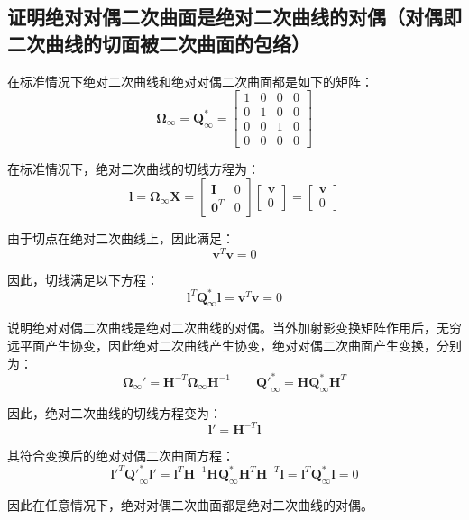\documentclass[11pt]{article}
\begin{document}
\subsection{证明绝对对偶二次曲面是绝对二次曲线的对偶（对偶即二次曲线的切面被二次曲面的包络）}
在标准情况下绝对二次曲线和绝对对偶二次曲面都是如下的矩阵：
\begin{equation*}
  \mathbold{\Omega}_\infty=\mathbold{Q}^*_\infty=\begin{bmatrix}
    1 & 0 & 0 & 0 \\
    0 & 1 & 0 & 0 \\
    0 & 0 & 1 & 0 \\
    0 & 0 & 0 & 0
  \end{bmatrix}
\end{equation*}\par
在标准情况下，绝对二次曲线的切线方程为：
\begin{equation*}
  \mathbold{l}=\mathbold{\Omega}_\infty\mathbold{X}=\begin{bmatrix}
    \mathbf{I}   & 0 \\
    \mathbf{0}^T & 0
  \end{bmatrix}\begin{bmatrix}
    \mathbf{v} \\ 0
  \end{bmatrix}=\begin{bmatrix}
    \mathbf{v} \\ 0
  \end{bmatrix}
\end{equation*}\par
由于切点在绝对二次曲线上，因此满足：
\begin{equation*}
  \mathbold{v}^T\mathbold{v}=0
\end{equation*}\par
因此，切线满足以下方程：
\begin{equation*}
  \mathbf{l}^T\mathbf{Q}_\infty^*\mathbf{l}=\mathbf{v}^T\mathbf{v}=0
\end{equation*}\par
说明绝对对偶二次曲线是绝对二次曲线的对偶。当外加射影变换矩阵作用后，无穷远平面产生协变，因此绝对二次曲线产生协变，绝对对偶二次曲面产生变换，分别为：
\begin{equation*}
  \mathbold{\Omega}_\infty'=\mathbold{H}^{-T}\mathbold{\Omega}_\infty\mathbold{H}^{-1}\qquad\mathbf{Q'}_\infty^{*}=\mathbold{H}\mathbold{Q}_\infty^*\mathbold{H}^T
\end{equation*}\par
因此，绝对二次曲线的切线方程变为：
\begin{equation*}
  \mathbold{l}'=\mathbf{H}^{-T}\mathbf{l}
\end{equation*}\par
其符合变换后的绝对对偶二次曲面方程：
\begin{equation*}
  \mathbf{l'}^T\mathbf{Q'}_\infty^{*}\mathbf{l'}=\mathbf{l}^T\mathbf{H}^{-1}\mathbf{H}\mathbf{Q}_\infty^*\mathbf{H}^T\mathbf{H}^{-T}\mathbf{l}=\mathbf{l}^T\mathbf{Q}_\infty^*\mathbf{l}=0
\end{equation*}\par
因此在任意情况下，绝对对偶二次曲面都是绝对二次曲线的对偶。
\end{document}
